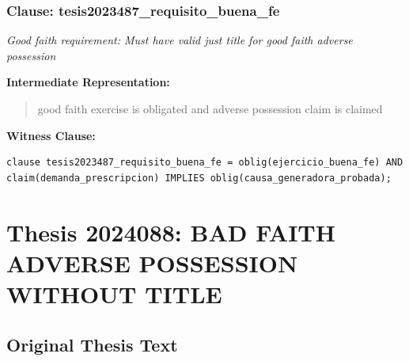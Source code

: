 \documentclass[11pt,a4paper]{article}
\begin{document}
\subsubsection{Clause: tesis2023487\_requisito\_buena\_fe}

\textit{Good faith requirement: Must have valid just title for good faith adverse possession}

\textbf{Intermediate Representation:}

\begin{quote}
good faith exercise is obligated and adverse possession claim is claimed
\end{quote}

\textbf{Witness Clause:}

\begin{lstlisting}[style=witnessstyle, language=Witness]
clause tesis2023487_requisito_buena_fe = oblig(ejercicio_buena_fe) AND claim(demanda_prescripcion) IMPLIES oblig(causa_generadora_probada);
\end{lstlisting}

\newpage

\section{Thesis 2024088: BAD FAITH ADVERSE POSSESSION WITHOUT TITLE}
\label{thesis:2024088}

\subsection{Original Thesis Text}
\end{document}
